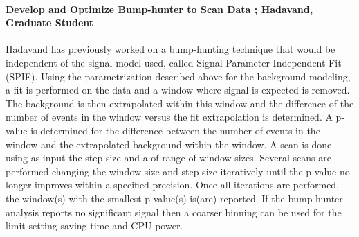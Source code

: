 
\paragraph{Develop and Optimize Bump-hunter to Scan Data ;  Hadavand, Graduate Student} %
Hadavand has previously worked on a bump-hunting technique that would be independent of the signal model used, called Signal Parameter Independent Fit (SPIF).  Using the parametrization described above for the background modeling, a fit is performed on the data and a window where signal is expected is removed.
The background is then extrapolated within this window and the difference of the number of events in the window versus the fit extrapolation is determined.  A p-value is determined for the difference between the number of events in the window and the extrapolated background within the window.
A scan is done using as input the step size and a of range of window sizes.  Several scans are performed changing the window size and step size iteratively until the p-value no longer improves within a specified precision.
Once all iterations are performed, the window(s) with the smallest p-value(s) is(are) reported.  
If the bump-hunter analysis reports no significant signal then a coarser binning can be used for the limit setting saving time and CPU power.




